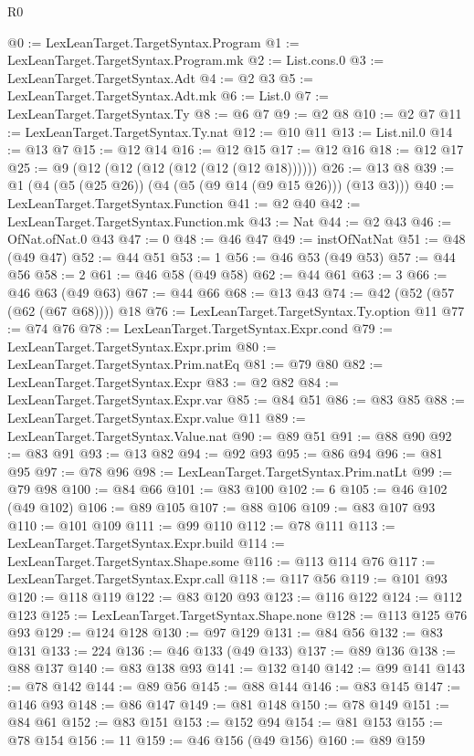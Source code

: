 \begin{lexlean}{R0}
\begin{coremodule}
@0 := LexLeanTarget.TargetSyntax.Program
@1 := LexLeanTarget.TargetSyntax.Program.mk
@2 := List.cons.{0}
@3 := LexLeanTarget.TargetSyntax.Adt
@4 := @2 @3
@5 := LexLeanTarget.TargetSyntax.Adt.mk
@6 := List.{0}
@7 := LexLeanTarget.TargetSyntax.Ty
@8 := @6 @7
@9 := @2 @8
@10 := @2 @7
@11 := LexLeanTarget.TargetSyntax.Ty.nat
@12 := @10 @11
@13 := List.nil.{0}
@14 := @13 @7
@15 := @12 @14
@16 := @12 @15
@17 := @12 @16
@18 := @12 @17
@25 := @9 (@12 (@12 (@12 (@12 (@12 (@12 @18))))))
@26 := @13 @8
@39 := @1 (@4 (@5 (@25 @26)) (@4 (@5 (@9 @14 (@9 @15 @26))) (@13 @3)))
@40 := LexLeanTarget.TargetSyntax.Function
@41 := @2 @40
@42 := LexLeanTarget.TargetSyntax.Function.mk
@43 := Nat
@44 := @2 @43
@46 := OfNat.ofNat.{0} @43
@47 := 0
@48 := @46 @47
@49 := instOfNatNat
@51 := @48 (@49 @47)
@52 := @44 @51
@53 := 1
@56 := @46 @53 (@49 @53)
@57 := @44 @56
@58 := 2
@61 := @46 @58 (@49 @58)
@62 := @44 @61
@63 := 3
@66 := @46 @63 (@49 @63)
@67 := @44 @66
@68 := @13 @43
@74 := @42 (@52 (@57 (@62 (@67 @68)))) @18
@76 := LexLeanTarget.TargetSyntax.Ty.option @11
@77 := @74 @76
@78 := LexLeanTarget.TargetSyntax.Expr.cond
@79 := LexLeanTarget.TargetSyntax.Expr.prim
@80 := LexLeanTarget.TargetSyntax.Prim.natEq
@81 := @79 @80
@82 := LexLeanTarget.TargetSyntax.Expr
@83 := @2 @82
@84 := LexLeanTarget.TargetSyntax.Expr.var
@85 := @84 @51
@86 := @83 @85
@88 := LexLeanTarget.TargetSyntax.Expr.value @11
@89 := LexLeanTarget.TargetSyntax.Value.nat
@90 := @89 @51
@91 := @88 @90
@92 := @83 @91
@93 := @13 @82
@94 := @92 @93
@95 := @86 @94
@96 := @81 @95
@97 := @78 @96
@98 := LexLeanTarget.TargetSyntax.Prim.natLt
@99 := @79 @98
@100 := @84 @66
@101 := @83 @100
@102 := 6
@105 := @46 @102 (@49 @102)
@106 := @89 @105
@107 := @88 @106
@109 := @83 @107 @93
@110 := @101 @109
@111 := @99 @110
@112 := @78 @111
@113 := LexLeanTarget.TargetSyntax.Expr.build
@114 := LexLeanTarget.TargetSyntax.Shape.some
@116 := @113 @114 @76
@117 := LexLeanTarget.TargetSyntax.Expr.call
@118 := @117 @56
@119 := @101 @93
@120 := @118 @119
@122 := @83 @120 @93
@123 := @116 @122
@124 := @112 @123
@125 := LexLeanTarget.TargetSyntax.Shape.none
@128 := @113 @125 @76 @93
@129 := @124 @128
@130 := @97 @129
@131 := @84 @56
@132 := @83 @131
@133 := 224
@136 := @46 @133 (@49 @133)
@137 := @89 @136
@138 := @88 @137
@140 := @83 @138 @93
@141 := @132 @140
@142 := @99 @141
@143 := @78 @142
@144 := @89 @56
@145 := @88 @144
@146 := @83 @145
@147 := @146 @93
@148 := @86 @147
@149 := @81 @148
@150 := @78 @149
@151 := @84 @61
@152 := @83 @151
@153 := @152 @94
@154 := @81 @153
@155 := @78 @154
@156 := 11
@159 := @46 @156 (@49 @156)
@160 := @89 @159

\end{coremodule}
\end{lexlean}
